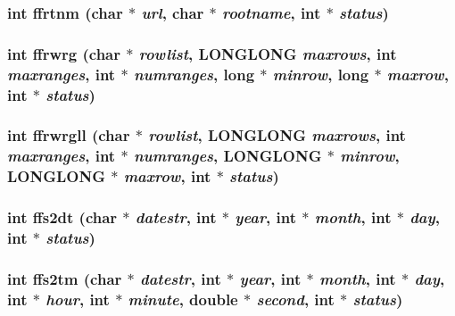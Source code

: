 \subsubsection{\setlength{\rightskip}{0pt plus 5cm}int ffrtnm (char $\ast$ {\em url}, char $\ast$ {\em rootname}, int $\ast$ {\em status})}\label{fitsio__64_8h_3caef8f2e1fa0c29ba79cfd854862f7e}


\subsubsection{\setlength{\rightskip}{0pt plus 5cm}int ffrwrg (char $\ast$ {\em rowlist}, \bf{LONGLONG} {\em maxrows}, int {\em maxranges}, int $\ast$ {\em numranges}, long $\ast$ {\em minrow}, long $\ast$ {\em maxrow}, int $\ast$ {\em status})}\label{fitsio__64_8h_2a49a73ce7919bc7fd5f1c3ed5bf0090}


\subsubsection{\setlength{\rightskip}{0pt plus 5cm}int ffrwrgll (char $\ast$ {\em rowlist}, \bf{LONGLONG} {\em maxrows}, int {\em maxranges}, int $\ast$ {\em numranges}, \bf{LONGLONG} $\ast$ {\em minrow}, \bf{LONGLONG} $\ast$ {\em maxrow}, int $\ast$ {\em status})}\label{fitsio__64_8h_e997ee959852fc3d52dd2bbd9ba45819}


\subsubsection{\setlength{\rightskip}{0pt plus 5cm}int ffs2dt (char $\ast$ {\em datestr}, int $\ast$ {\em year}, int $\ast$ {\em month}, int $\ast$ {\em day}, int $\ast$ {\em status})}\label{fitsio__64_8h_088b875388fc72d3d8ad8134a025f00c}


\subsubsection{\setlength{\rightskip}{0pt plus 5cm}int ffs2tm (char $\ast$ {\em datestr}, int $\ast$ {\em year}, int $\ast$ {\em month}, int $\ast$ {\em day}, int $\ast$ {\em hour}, int $\ast$ {\em minute}, double $\ast$ {\em second}, int $\ast$ {\em status})}\label{fitsio__64_8h_1f6250df0ad32ae2dedecc8e87c5a0c4}


